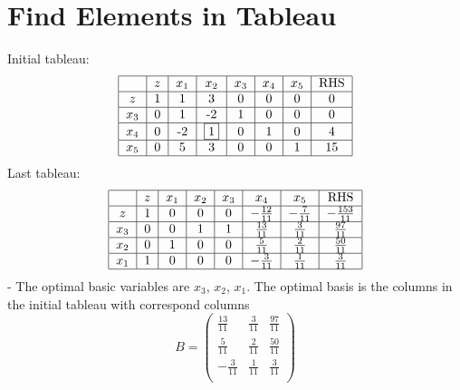 		\section{Find Elements in Tableau}
				Initial tableau:\\
				\begin{align}
					\begin{tabular} {|c|c|c|c|c|c|c|c|}
						\hline
						& $z$ & $x_1$ & $x_2$ & $x_3$ & $x_4$ & $x_5$ & RHS \\
						\hline
						$z$ & 1 & 1 & 3 & 0 & 0 & 0 & 0 \\
						\hline
						$x_3$ & 0 & 1 & -2 & 1 & 0 & 0 & 0 \\
						\hline
						$x_4$ & 0 & -2 & \framebox{1} & 0 & 1 & 0 & 4\\
						\hline
						$x_5$ & 0 & 5 & 3 & 0 & 0 & 1 & 15 \\
						\hline
					\end{tabular}
				\end{align}
				Last tableau:\\
				\begin{align}
					\begin{tabular} {|c|c|c|c|c|c|c|c|}
						\hline
						& $z$ & $x_1$ & $x_2$ & $x_3$ & $x_4$ & $x_5$ & RHS \\
						\hline
						$z$ & 1 & 0 & 0 & 0 & $-\frac{12}{11}$ & $-\frac{7}{11}$ & $-\frac{153}{11}$ \\
						\hline
						$x_3$ & 0 & 0 & 1 & 1 & $\frac{13}{11}$ & $\frac{3}{11}$ & $\frac{97}{11}$ \\
						\hline
						$x_2$ & 0 & 1 & 0 & 0 & $\frac{5}{11}$ & $\frac{2}{11}$ & $\frac{50}{11}$ \\
						\hline
						$x_1$ & 1 & 0 & 0 & 0 & $-\frac{3}{11}$ & $\frac{1}{11}$ & $\frac{3}{11}$ \\
						\hline
					\end{tabular}
				\end{align}
				- The optimal basic variables are $x_3$, $x_2$, $x_1$. The optimal basis is the columns in the initial tableau with correspond columns
				\begin{equation}
					B = \left(\begin{matrix}
						\frac{13}{11} & \frac{3}{11} & \frac{97}{11}\\
						\frac{5}{11} & \frac{2}{11} & \frac{50}{11}\\
						-\frac{3}{11} & \frac{1}{11} & \frac{3}{11}\\
					\end{matrix}\right)
				\end{equation}
